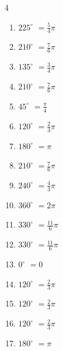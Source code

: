 \begin{multicols}{4}
\begin{enumerate}
  \item $\displaystyle 225^{\circ}$
        $\displaystyle =\frac{5}{4}\pi$

  \item $\displaystyle 210^{\circ}$
        $\displaystyle =\frac{7}{6}\pi$

  \item $\displaystyle 135^{\circ}$
        $\displaystyle =\frac{3}{4}\pi$

  \item $\displaystyle 210^{\circ}$
        $\displaystyle =\frac{7}{6}\pi$

  \item $\displaystyle 45^{\circ}$
        $\displaystyle =\frac{\pi}{4}$

  \item $\displaystyle 120^{\circ}$
        $\displaystyle =\frac{2}{3}\pi$

  \item $\displaystyle 180^{\circ}$
        $\displaystyle =\pi$

  \item $\displaystyle 210^{\circ}$
        $\displaystyle =\frac{7}{6}\pi$

  \item $\displaystyle 240^{\circ}$
        $\displaystyle =\frac{4}{3}\pi$

  \item $\displaystyle 360^{\circ}$
        $\displaystyle =2\pi$

  \item $\displaystyle 330^{\circ}$
        $\displaystyle =\frac{11}{6}\pi$

  \item $\displaystyle 330^{\circ}$
        $\displaystyle =\frac{11}{6}\pi$

  \item $\displaystyle 0^{\circ}$
        $\displaystyle =0$

  \item $\displaystyle 120^{\circ}$
        $\displaystyle =\frac{2}{3}\pi$

  \item $\displaystyle 120^{\circ}$
        $\displaystyle =\frac{2}{3}\pi$

  \item $\displaystyle 120^{\circ}$
        $\displaystyle =\frac{2}{3}\pi$

\columnbreak %

\resetques

  \item $\displaystyle 180^{\circ}$
        $\displaystyle =\pi$


\end{enumerate}
\end{multicols}
